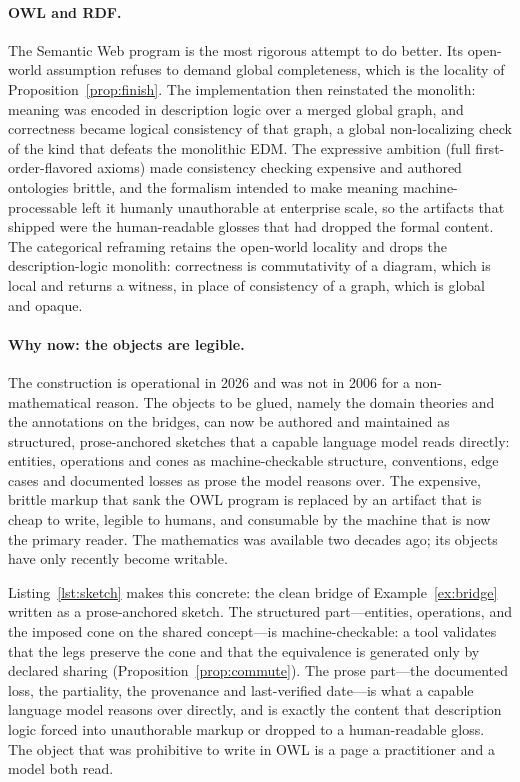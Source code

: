 \documentclass[11pt]{article}
\theoremstyle{plain}
\theoremstyle{definition}
\begin{document}
\paragraph{OWL and RDF.} The Semantic Web program is the most rigorous attempt to do better. Its open-world assumption refuses to demand global completeness, which is the locality of Proposition~\ref{prop:finish}. The implementation then reinstated the monolith: meaning was encoded in description logic over a merged global graph, and correctness became logical consistency of that graph, a global non-localizing check of the kind that defeats the monolithic EDM. The expressive ambition (full first-order-flavored axioms) made consistency checking expensive and authored ontologies brittle, and the formalism intended to make meaning machine-processable left it humanly unauthorable at enterprise scale, so the artifacts that shipped were the human-readable glosses that had dropped the formal content. The categorical reframing retains the open-world locality and drops the description-logic monolith: correctness is commutativity of a diagram, which is local and returns a witness, in place of consistency of a graph, which is global and opaque.

\paragraph{Why now: the objects are legible.} The construction is operational in 2026 and was not in 2006 for a non-mathematical reason. The objects to be glued, namely the domain theories and the annotations on the bridges, can now be authored and maintained as structured, prose-anchored sketches that a capable language model reads directly: entities, operations and cones as machine-checkable structure, conventions, edge cases and documented losses as prose the model reasons over. The expensive, brittle markup that sank the OWL program is replaced by an artifact that is cheap to write, legible to humans, and consumable by the machine that is now the primary reader. The mathematics was available two decades ago; its objects have only recently become writable.

Listing~\ref{lst:sketch} makes this concrete: the clean bridge of Example~\ref{ex:bridge} written as a prose-anchored sketch. The structured part---entities, operations, and the imposed cone on the shared concept---is machine-checkable: a tool validates that the legs preserve the cone and that the equivalence is generated only by declared sharing (Proposition~\ref{prop:commute}). The prose part---the documented loss, the partiality, the provenance and last-verified date---is what a capable language model reasons over directly, and is exactly the content that description logic forced into unauthorable markup or dropped to a human-readable gloss. The object that was prohibitive to write in OWL is a page a practitioner and a model both read.
\end{document}
